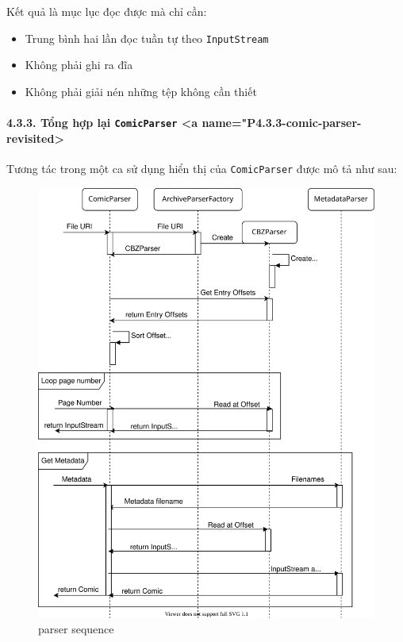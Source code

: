 \documentclass[
]{article}
\providecommand{\tightlist}{%
  \setlength{\itemsep}{0pt}\setlength{\parskip}{0pt}}
\begin{document}
Kết quả là mục lục đọc được mà chỉ cần:

\begin{itemize}
\tightlist
\item
  Trung bình hai lần đọc tuần tự theo \texttt{InputStream}
\item
  Không phải ghi ra đĩa
\item
  Không phải giải nén những tệp không cần thiết
\end{itemize}

\hypertarget{tux1ed5ng-hux1ee3p-lux1ea1i-comicparser-a-namep4.3.3-comic-parser-revisited}{%
\paragraph{\texorpdfstring{4.3.3. Tổng hợp lại \texttt{ComicParser}
\textless a
name="P4.3.3-comic-parser-revisited\textgreater{}}{4.3.3. Tổng hợp lại ComicParser \textless a name="P4.3.3-comic-parser-revisited\textgreater{}}}\label{tux1ed5ng-hux1ee3p-lux1ea1i-comicparser-a-namep4.3.3-comic-parser-revisited}}

Tương tác trong một ca sử dụng hiển thị của \texttt{ComicParser} được mô
tả như sau:

\begin{figure}
\centering
\includegraphics{../images/parser_sequence.svg}
\caption{parser sequence}
\end{figure}
\end{document}
